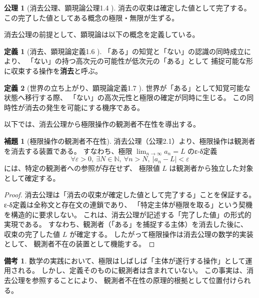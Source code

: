 \documentclass[11pt,a4paper]{article}
\theoremstyle{definition}
\newtheorem{definition}{定義}[section]
\newtheorem{axiom}{公理}[section]
\newtheorem{lemma}{補題}[section]
\newtheorem{remark}{備考}[section]
\begin{document}
\begin{axiom}[消去公理、顕現論公理1.4 \cite{Chiba2026_chikaku}]
消去の収束は確定した値として完了する。
この完了した値としてある概念の極限・無限が生ずる。
\end{axiom}

消去公理の前提として、顕現論は以下の概念を定義している。

\begin{definition}[消去、顕現論定義1.6 \cite{Chiba2026_chikaku}]
「ある」の知覚と「ない」の認識の同時成立により、
「ない」の持つ高次元の可能性が低次元の「ある」として
捕捉可能な形に収束する操作を\textbf{消去}と呼ぶ。
\end{definition}

\begin{definition}[世界の立ち上がり、顕現論定義1.7 \cite{Chiba2026_chikaku}]
世界が「ある」として知覚可能な状態へ移行する際、
「ない」の高次元性と極限の確定が同時に生じる。
この同時性が消去の発生を可能にする機序である。
\end{definition}

以下では、消去公理から極限操作の観測者不在性を導出する。

\begin{lemma}[極限操作の観測者不在性]
消去公理（公理2.1）より、極限操作は観測者を消去する装置である。
すなわち、極限 $\lim_{n \to \infty} a_n = L$ のε-δ定義
$$\forall \varepsilon > 0,\ \exists N \in \mathbb{N},\ \forall n > N,\
|a_n - L| < \varepsilon$$
には、特定の観測者への参照が存在せず、
極限値 $L$ は観測者から独立した対象として確定する。
\end{lemma}

\begin{proof}
消去公理は「消去の収束が確定した値として完了する」ことを保証する。
ε-δ定義は全称文と存在文の連鎖であり、
「特定主体が極限を取る」という契機を構造的に要求しない。
これは、消去公理が記述する「完了した値」の形式的実現である。
すなわち、観測者（「ある」を捕捉する主体）を消去した後に、
収束の完了した値 $L$ が確定する。
したがって極限操作は消去公理の数学的実装として、
観測者不在の装置として機能する。
\end{proof}

\begin{remark}
数学の実践において、極限はしばしば「主体が遂行する操作」として運用される。
しかし、定義そのものに観測者は含まれていない。
この事実は、消去公理を参照することにより、
観測者不在性の原理的根拠として位置付けられる。
\end{remark}

\end{document}
